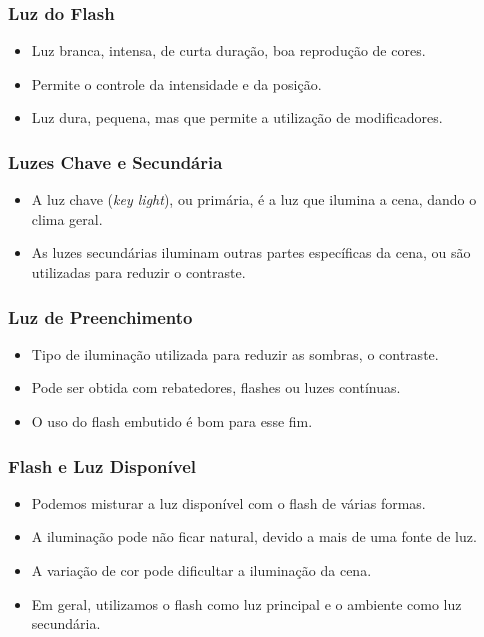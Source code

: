 
\begin{frame}
  \frametitle{Luz do Flash}
  \begin{itemize}
      \item Luz branca, intensa, de curta duração, boa reprodução de cores.
      \item Permite o controle da intensidade e da posição.
      \item Luz dura, pequena, mas que permite a utilização de modificadores.
  \end{itemize}
\end{frame}


\begin{frame}
  \frametitle{Luzes Chave e Secundária}
  \begin{itemize}
      \item A luz chave (\textit{key light}), ou primária, é a luz que ilumina a cena,
      dando o clima geral.
      \item As luzes secundárias iluminam outras partes específicas da cena, ou são
      utilizadas para reduzir o contraste.
  \end{itemize}
\end{frame}

\begin{frame}
  \frametitle{Luz de Preenchimento}
  \begin{itemize}
      \item Tipo de iluminação utilizada para reduzir as sombras, o contraste.
      \item Pode ser obtida com rebatedores, flashes ou luzes contínuas.
      \item O uso do flash embutido é bom para esse fim.
  \end{itemize}
\end{frame}


\begin{frame}
  \frametitle{Flash e Luz Disponível}
  \begin{itemize}
      \item Podemos misturar a luz disponível com o flash de várias formas.
      \item A iluminação pode não ficar natural, devido a mais de uma fonte de luz.
      \item A variação de cor pode dificultar a iluminação da cena.
      \item Em geral, utilizamos o flash como luz principal e o ambiente como
      luz secundária.
  \end{itemize}
\end{frame}

